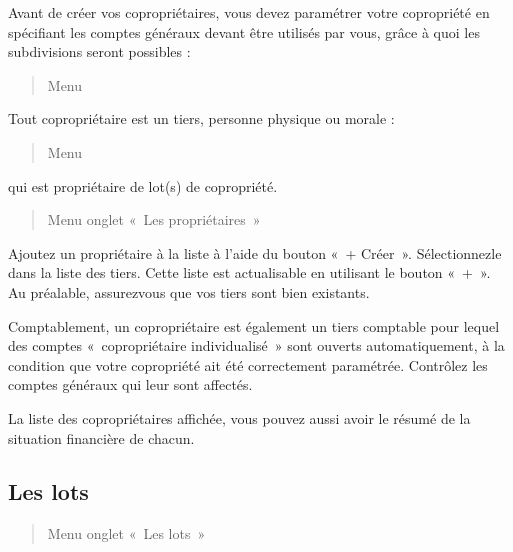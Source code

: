 \documentclass[a4paper,10pt,oneside,french]{sphinxmanual}
\begin{document}
\sphinxAtStartPar
Avant de créer vos copropriétaires, vous devez paramétrer votre copropriété en spécifiant les comptes généraux devant être utilisés par vous, grâce à quoi les subdivisions seront possibles :
\begin{quote}

\sphinxAtStartPar
Menu 
\end{quote}

\sphinxAtStartPar
Tout copropriétaire est un tiers, personne physique ou morale :
\begin{quote}

\sphinxAtStartPar
Menu 
\end{quote}

\sphinxAtStartPar
qui est propriétaire de lot(s) de copropriété.
\begin{quote}

\sphinxAtStartPar
Menu  \sphinxhyphen{} onglet « Les propriétaires »
\end{quote}

\sphinxAtStartPar
Ajoutez un propriétaire à la liste à l’aide du bouton « + Créer ».
Sélectionnez\sphinxhyphen{}le dans la liste des tiers. Cette liste est actualisable en utilisant le bouton « + ». Au préalable, assurez\sphinxhyphen{}vous que vos tiers sont bien existants.

\sphinxAtStartPar
Comptablement, un copropriétaire est également un tiers comptable pour lequel des comptes « copropriétaire individualisé » sont ouverts automatiquement, à la condition que votre copropriété ait été correctement paramétrée. Contrôlez les comptes généraux qui leur sont affectés.

\sphinxAtStartPar
La liste des copropriétaires affichée, vous pouvez aussi avoir le résumé de la situation financière de chacun.


\subsection{Les lots}
\label{\detokenize{condominium/owners:les-lots}}\begin{quote}

\sphinxAtStartPar
Menu  \sphinxhyphen{} onglet « Les lots »
\end{quote}
\end{document}
